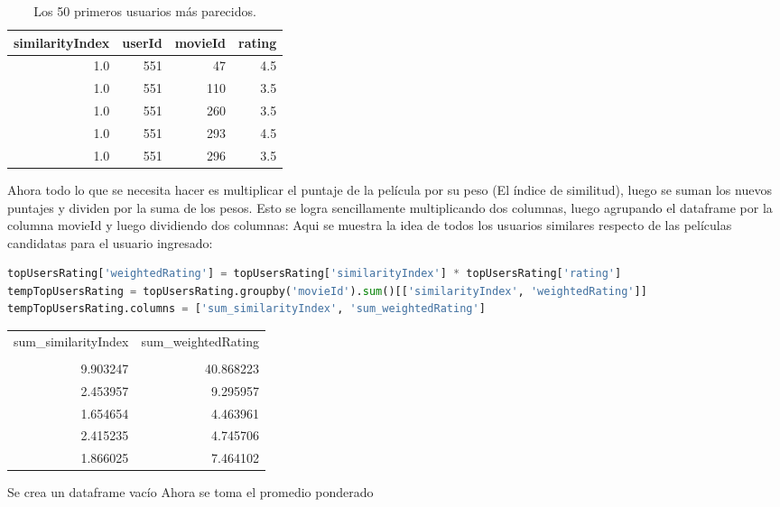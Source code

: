\documentclass{uimppracticas}
\begin{document}
\begin{table}[h]
	\centering
	\begin{tabular}{rrrr}
		\toprule
		similarityIndex &  userId &  movieId &  rating \\
		\midrule
		1.0 &     551 &       47 &     4.5 \\
		1.0 &     551 &      110 &     3.5 \\
		1.0 &     551 &      260 &     3.5 \\
		1.0 &     551 &      293 &     4.5 \\
		1.0 &     551 &      296 &     3.5 \\
		\bottomrule
	\end{tabular}
	\caption{Los 50 primeros usuarios más parecidos.}
	\label{usuarios_parecidos}
\end{table}

Ahora todo lo que se necesita hacer es multiplicar el puntaje de la película por su peso (El índice de similitud), luego se suman los nuevos puntajes y dividen por la suma de los pesos.
Esto se logra sencillamente multiplicando dos columnas, luego agrupando el dataframe por la columna movieId y luego dividiendo dos columnas:
Aqui se muestra la idea de todos los usuarios similares respecto de las películas candidatas para el usuario ingresado:

\begin{lstlisting}[language=python, basicstyle=\small]
topUsersRating['weightedRating'] = topUsersRating['similarityIndex'] * topUsersRating['rating']
tempTopUsersRating = topUsersRating.groupby('movieId').sum()[['similarityIndex', 'weightedRating']]
tempTopUsersRating.columns = ['sum_similarityIndex', 'sum_weightedRating']
\end{lstlisting}

\begin{tabular}{rr}
	\toprule
	sum\_similarityIndex &  sum\_weightedRating \\
	&                     \\
	\midrule
	9.903247 &           40.868223 \\
	2.453957 &            9.295957 \\
	1.654654 &            4.463961 \\
	2.415235 &            4.745706 \\
	1.866025 &            7.464102 \\
	\bottomrule
\end{tabular}

Se crea un dataframe vacío
Ahora se toma el promedio ponderado
\end{document}
